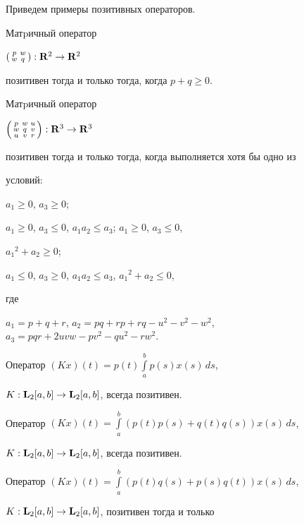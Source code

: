Приведем примеры позитивных операторов.





Матpичный оператор


$\left(\begin{smallmatrix}p&w\\w&q\end{smallmatrix}\right):


\spc{R}^2\to\spc{R}^2$


позитивен тогда и только тогда, когда $p+q\ge0$.





Матpичный оператор


$\left(\begin{smallmatrix}p&w&u\\w&q&v\\u&v&r\end{smallmatrix}\right):


\spc{R}^3\to\spc{R}^3$


позитивен тогда и только тогда, когда выполняется хотя бы одно из


условий:





\noindent$a_1\ge0$, $a_3\ge0$;


$a_1\ge0$, $a_3\le0$, $a_1a_2\le a_3$; $a_1\ge0$, $a_3\le0$,


${a_1}^2+a_2\ge0$;


$a_1\le0$, $a_3\ge0$, $a_1a_2\le a_3$, ${a_1}^2+a_2\le0$,


где


$a_1=p+q+r$, $a_2=pq+rp+rq-u^2-v^2-w^2$, $a_3=pqr+2uvw-pv^2-qu^2-rw^2$.





Оператор $(Kx)(t)=p(t)\int\limits_a^bp(s)x(s)\,ds$,


$K:{\bold L}_2[a,b]\to{\bold L}_2[a,b]$, всегда позитивен.





Оператор $(Kx)(t)=\int\limits_a^b(p(t)p(s)+q(t)q(s))x(s)\,ds$,


$K:{\bold L}_2[a,b]\to{\bold L}_2[a,b]$, всегда позитивен.





Оператор $(Kx)(t)=\int\limits_a^b(p(t)q(s)+p(s)q(t))x(s)\,ds$,


$K:{\bold L}_2[a,b]\to{\bold L}_2[a,b]$, позитивен тогда и только


